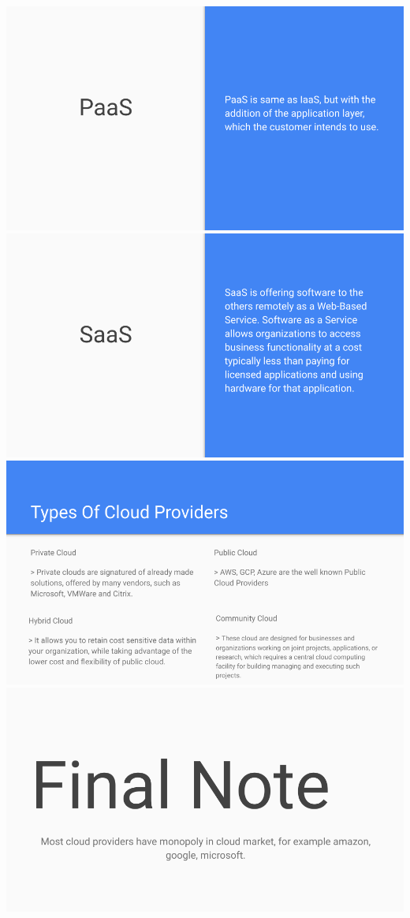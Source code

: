 \documentclass[17pt,a4paper,oneside,margin=1in]{article}
\begin{document}
\begin{center}
	\includegraphics[width=0.7\linewidth]{./scrot/cloud4.png}
	\includegraphics[width=0.7\linewidth]{./scrot/cloud5.png}
	\includegraphics[width=0.7\linewidth]{./scrot/cloud6.png}
	\includegraphics[width=0.7\linewidth]{./scrot/cloud7.png}
\end{center}
\end{document}
